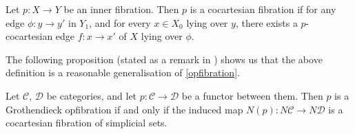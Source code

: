 \documentclass{MetricNotes2023}
\begin{document}
\begin{definition}
Let \(p : X \to Y\) be an inner fibration. Then \(p\) is a cocartesian fibration if for any edge \(\phi : y \to y'\) in \(Y_1\), and for every \(x \in X_0\) lying over \(y\), there exists a \(p\)-cocartesian edge \(f : x \to x'\) of \(X\) lying over \(\phi\). 
\end{definition}

The following proposition (stated as a remark in \autocite{lurie2008higher}) shows us that the above definition is a reasonable generalisation of \ref{opfibration}. 

\begin{proposition}
Let \(\mathcal{C}\), \(\mathcal{D}\) be categories, and let \(p : \mathcal{C} \to \mathcal{D}\) be a functor between them. Then \(p\) is a Grothendieck opfibration if and only if the induced map \(N(p) : N \mathcal{C} \to N\mathcal{D}\) is a cocartesian fibration of simplicial sets.
\end{proposition}
\end{document}
